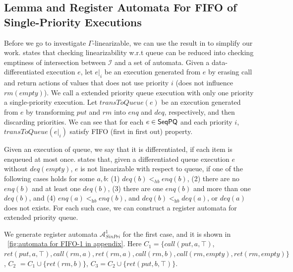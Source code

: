 \subsection{Lemma and Register Automata For FIFO of Single-Priority Executions}
\label{sec:appendix lemma and register automata for FIFO of single-priority executions}

Before we go to investigate $\Gamma$-linearizable, we can use the result in \cite{DBLP:conf/icalp/BouajjaniEEH15} to simplify our work. \cite{DBLP:conf/icalp/BouajjaniEEH15} states that checking linearizability w.r.t queue can be reduced into checking emptiness of intersection between $\mathcal{I}$ and a set of automata. Given a data-differentiated execution $e$, let $e \vert_{i}$ be an execution generated from $e$ by erasing call and return actions of values that does not use priority $i$ (does not influence $\textit{rm}(\textit{empty})$). We call a extended priority queue execution with only one priority a single-priority execution. Let $\textit{transToQueue}(e)$ be an execution generated from $e$ by transforming $\textit{put}$ and $\textit{rm}$ into $\textit{enq}$ and $\textit{deq}$, respectively, and then discarding priorities. We can see that for each $e \in \mathsf{SeqPQ}$ and each priority $i$, $\textit{transToQueue}(e \vert_{i})$ satisfy FIFO (first in first out) property.

Given an execution of queue, we say that it is differentiated, if each item is enqueued at most once. \cite{DBLP:conf/icalp/BouajjaniEEH15} states that, given a differentiated queue execution $e$ without $\textit{deq}(\textit{empty})$, $e$ is not linearizable with respect to queue, if one of the following cases holds for some $a,b$: (1) $\textit{deq}(b) <_{hb} \textit{enq}(b)$, (2) there are no $\textit{enq}(b)$ and at least one $\textit{deq}(b)$, (3) there are one $\textit{enq}(b)$ and more than one $\textit{deq}(b)$, and (4) $\textit{enq}(a) <_{\textit{hb}} \textit{enq}(b)$, and $\textit{deq}(b) <_{\textit{hb}} \textit{deq}(a)$, or $\textit{deq}(a)$ does not exists. For each such case, we can construct a register automata for extended priority queue.

We generate register automata $\mathcal{A}_{\textit{SinPri}}^1$ for the first case, and it is shown in \figurename~\ref{fig:automata for FIFO-1 in appendix}. Here $C_1 = \{ \textit{call}(\textit{put},a,\top)$, $\textit{ret}(\textit{put},a,\top), \textit{call}(\textit{rm},a),\textit{ret}(\textit{rm},a),\textit{call}(\textit{rm},b),\textit{call}(\textit{rm},\textit{empty}),\textit{ret}(\textit{rm},\textit{empty}) \}$, $C_2$ $= C_1 \cup \{ \textit{ret}(\textit{rm},b) \}$, $C_3 = C_2 \cup \{ \textit{ret}(\textit{put},b,\top) \}$.


